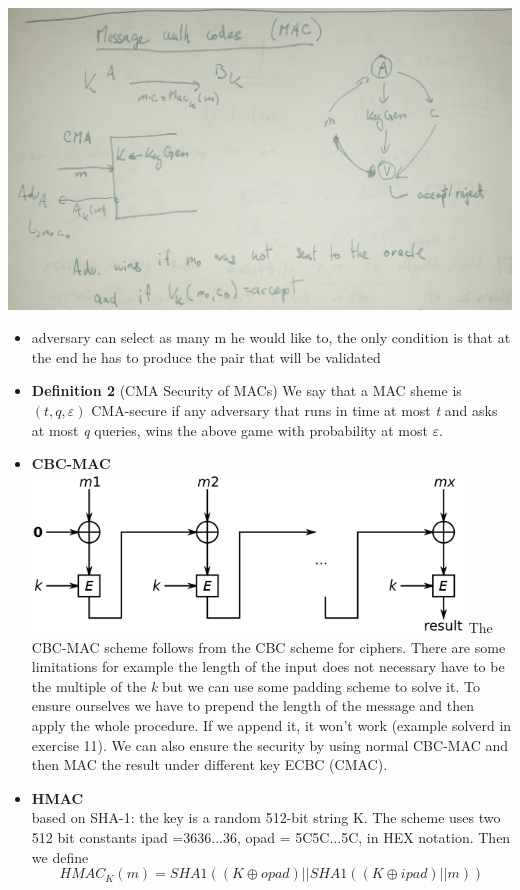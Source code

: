 \documentclass[a4paper,10pt]{article}
\begin{document}
\includegraphics[width=\textwidth]{MAC.jpg}
\begin{itemize}
\item adversary can select as many m he would like to, the only condition is that at the end he has to produce the pair that will be validated
\item \textbf{Definition 2} (CMA Security of MACs) We say that a MAC sheme
is $(t,q,\varepsilon)$ CMA-secure if any adversary that runs in time at most \textit{t} and asks at most \textit{q} queries, wins the above game with probability at most $\varepsilon$.
\item \textbf{CBC-MAC}\\
\includegraphics[width=0.9\textwidth]{CBC-MAC.png}
The CBC-MAC scheme follows from the CBC scheme for ciphers. There are some limitations for example the length of the input does not necessary have to be the multiple of the \textit{k} but we can use some padding scheme to solve it. To ensure ourselves we have to prepend the length of the message and then apply the whole procedure. If we append it, it won't work (example solverd in exercise 11).
We can also ensure the security by using normal CBC-MAC and then MAC the result under different key ECBC (CMAC).
\item \textbf{HMAC}\\
based on SHA-1: the key is a random 512-bit string K. The scheme uses two 512 bit constants ipad =3636...36, opad = 5C5C...5C, in HEX notation. Then we define
$$
HMAC_K(m) = SHA1( (K \oplus opad) || SHA1((K \oplus ipad)||m) )
$$



\end{itemize}
\end{document}
